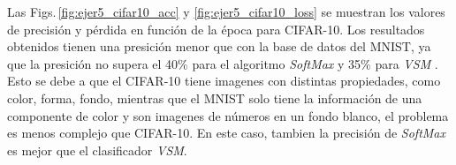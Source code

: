 Las Figs.\,\ref{fig:ejer5_cifar10_acc} y \ref{fig:ejer5_cifar10_loss} se muestran los valores de precisión y pérdida en función de la época para CIFAR-10.  Los resultados obtenidos tienen una presición menor que con la base de datos del MNIST, ya que la presición no supera el 40\% para el algoritmo \emph{SoftMax}  y 35\% para \emph{VSM} . Esto se debe a que el CIFAR-10 tiene imagenes con  distintas propiedades, como color, forma, fondo, mientras que el MNIST solo tiene la información de una componente de color y son imagenes de números  en un fondo blanco, el problema es menos complejo que CIFAR-10. En este caso, tambien la precisión de \emph{SoftMax} es mejor que el clasificador \emph{VSM}.%


